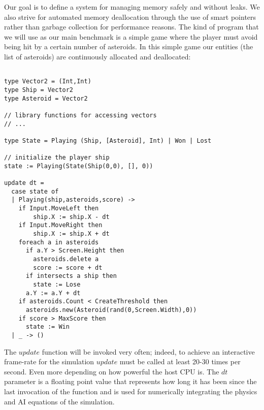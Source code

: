 Our goal is to define a system for managing memory safely
and without leaks. We also strive for automated memory deallocation through the use of smart pointers rather than
garbage collection for performance reasons. The kind of 
program that we will use as our main benchmark is a simple
game where the player must avoid being hit by a certain
number of asteroids. In this simple game our entities (the
list of asteroids) are continuously allocated and
deallocated:

\begin{lstlisting}

type Vector2 = (Int,Int)
type Ship = Vector2
type Asteroid = Vector2

// library functions for accessing vectors
// ...

type State = Playing (Ship, [Asteroid], Int) | Won | Lost

// initialize the player ship
state := Playing(State(Ship(0,0), [], 0))

update dt = 
  case state of
  | Playing(ship,asteroids,score) ->
    if Input.MoveLeft then
		ship.X := ship.X - dt
    if Input.MoveRight then
		ship.X := ship.X + dt
    foreach a in asteroids
      if a.Y > Screen.Height then
        asteroids.delete a
        score := score + dt
      if intersects a ship then 
        state := Lose
      a.Y := a.Y + dt
    if asteroids.Count < CreateThreshold then
      asteroids.new(Asteroid(rand(0,Screen.Width),0))
    if score > MaxScore then 
      state := Win
  | _ -> ()
\end{lstlisting}

The $update$ function will be invoked very often; indeed,
to achieve an interactive frame-rate for the simulation
$update$ must be called at least 20-30 times per second.
Even more depending on how powerful the host CPU is. The
$dt$ parameter is a floating point value that represents
how long it has been since the last invocation of the
function and is used for numerically integrating the
physics and AI equations of the simulation.

